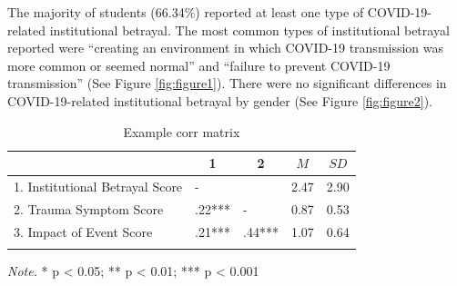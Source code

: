 \documentclass[
  english,
  man, noextraspace]{apa6}
\begin{document}
The majority of students (66.34\%) reported at least one type of COVID-19-related institutional betrayal. The most common types of institutional betrayal reported were \enquote{creating an environment in which COVID-19 transmission was more common or seemed normal} and \enquote{failure to prevent COVID-19 transmission} (See Figure \ref{fig:figure1}). There were no significant differences in COVID-19-related institutional betrayal by gender (See Figure \ref{fig:figure2}).

\begin{table}[tbp]

\begin{center}
\begin{threeparttable}

\caption{\label{tab:table1}Example corr matrix}

\begin{tabular}{lllll}
\toprule
 & \multicolumn{1}{c}{1} & \multicolumn{1}{c}{2} & \multicolumn{1}{c}{$M$} & \multicolumn{1}{c}{$SD$}\\
\midrule
1. Institutional Betrayal Score & - &  & 2.47 & 2.90\\
2. Trauma Symptom Score & .22*** & - & 0.87 & 0.53\\
3. Impact of Event Score & .21*** & .44*** & 1.07 & 0.64\\
\bottomrule
\addlinespace
\end{tabular}

\begin{tablenotes}[para]
\normalsize{\textit{Note.} * p < 0.05; ** p < 0.01; *** p < 0.001}
\end{tablenotes}

\end{threeparttable}
\end{center}

\end{table}
\end{document}
